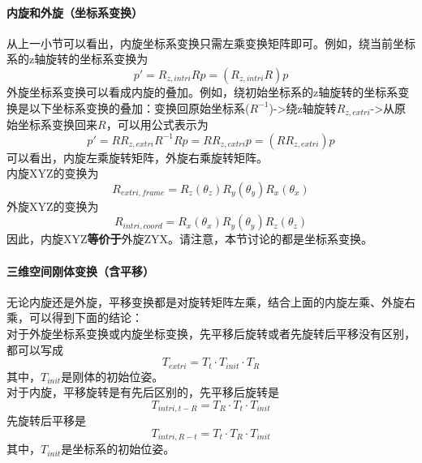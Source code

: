 \paragraph{内旋和外旋（坐标系变换）}
从上一小节可以看出，内旋坐标系变换只需左乘变换矩阵即可。例如，绕当前坐标系的z轴旋转的坐标系变换为
\begin{equation}
  p' = R_{z,intri} R p = (R_{z,intri} R) p
\end{equation}
外旋坐标系变换可以看成内旋的叠加。例如，绕初始坐标系的z轴旋转的坐标系变换是以下坐标系变换的叠加：变换回原始坐标系($R^{-1}$)->绕z轴旋转$R_{z,extri}$->从原始坐标系变换回来$R$，可以用公式表示为
\begin{equation}
  p' = R R_{z,extri} R^{-1} R p = R R_{z,extri} p = (R R_{z,extri}) p
\end{equation}
可以看出，内旋左乘旋转矩阵，外旋右乘旋转矩阵。\\
内旋XYZ的变换为
\begin{equation}
  R_{extri,frame}=R_z(\theta_z) R_y(\theta_y) R_x(\theta_x)
\end{equation}
外旋XYZ的变换为
\begin{equation}
  R_{intri,coord}=R_x(\theta_x) R_y(\theta_y) R_z(\theta_z)
\end{equation}
因此，内旋XYZ\textbf{等价于}外旋ZYX。请注意，本节讨论的都是坐标系变换。

\paragraph{三维空间刚体变换（含平移）}
无论内旋还是外旋，平移变换都是对旋转矩阵左乘，结合上面的内旋左乘、外旋右乘，可以得到下面的结论：\\
对于外旋坐标系变换或内旋坐标变换，先平移后旋转或者先旋转后平移没有区别，都可以写成
\begin{equation}
  T_{extri} = T_t \cdot T_{init} \cdot T_R
\end{equation}
其中，$T_{init}$是刚体的初始位姿。\\
对于内旋，平移旋转是有先后区别的，先平移后旋转是
\begin{equation}
  T_{intri,t-R} = T_R \cdot T_t \cdot T_{init}
\end{equation}
先旋转后平移是
\begin{equation}
  T_{intri,R-t} = T_t \cdot T_R \cdot T_{init}
\end{equation}
其中，$T_{init}$是坐标系的初始位姿。

